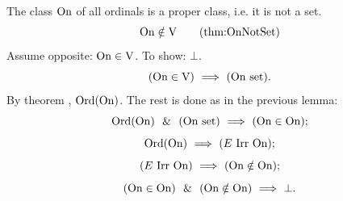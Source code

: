 \begin{theorem}
The class $\On$ of all ordinals is a proper class, i.e. it is not a set.
\[
\On\notin\V
\labeltagd{thm}{OnNotSet}
\]
\Proof
Assume opposite: $\On\in\V$. To show: $\bot$.
\[
(\On\in\V)
\IMPLIES
(\On\set).
\]
By theorem , $\Ord(\On)$. The rest is done as in the previous lemma:
\[
\Ord(\On)
\LAND
(\On\set)
\IMPLIES
(\On\in\On);
\]
\[
\Ord(\On)
\IMPLIES
(E\Irr\On);
\]
\[
(E\Irr\On)
\IMPLIES
(\On\notin\On);
\]
\[
(\On\in\On)
\LAND
(\On\notin\On)
\IMPLIES
\bot.
\]
\Done
\end{theorem}


